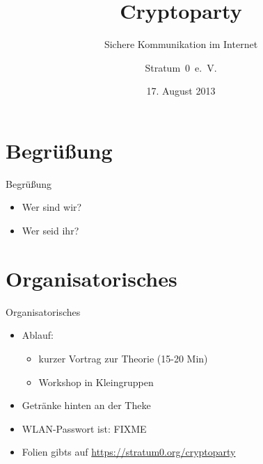\documentclass{beamer}
\author{Stratum~0~e.~V.}
\title{Cryptoparty}
\subtitle{Sichere Kommunikation im Internet}
\date{17. August 2013}
\begin{document}
\begin{frame}
	\maketitle
\end{frame}

\section{Begrüßung}
\begin{frame}{Begrüßung}
\begin{itemize}
	\item Wer sind wir?
	\item Wer seid ihr?
\end{itemize}
\end{frame}


\section{Organisatorisches}
\begin{frame}{Organisatorisches}
\begin{itemize}
	\item Ablauf:
		\begin{itemize}
			\item kurzer Vortrag zur Theorie (15-20 Min)
			\item Workshop in Kleingruppen
		\end{itemize}
	\item Getränke hinten an der Theke
	\item WLAN-Passwort ist: FIXME
	\item Folien gibts auf \url{https://stratum0.org/cryptoparty}
\end{itemize}
\end{frame}
\end{document}
